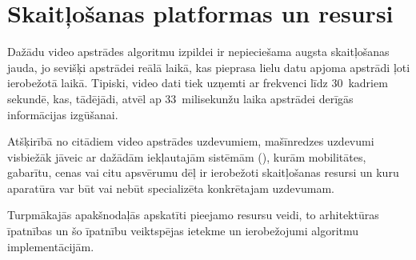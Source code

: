 \section{Skaitļošanas platformas un resursi} \label{sec:proc}
Dažādu video apstrādes algoritmu izpildei ir nepieciešama
augsta skaitļošanas jauda, jo sevišķi apstrādei reālā laikā, kas pieprasa
lielu datu apjoma apstrādi ļoti ierobežotā laikā. Tipiski, video dati
tiek uzņemti ar frekvenci līdz 30~kadriem sekundē, kas, tādējādi, atvēl ap
33~milisekunžu laika apstrādei derīgās informācijas izgūšanai.

Atšķirībā no citādiem video apstrādes uzdevumiem, mašīnredzes uzdevumi 
visbiežāk jāveic ar dažādām iekļautajām sistēmām (),
kurām mobilitātes, gabarītu, cenas vai citu apsvērumu dēļ ir ierobežoti
skaitļošanas resursi un kuru aparatūra var būt vai nebūt specializēta
konkrētajam uzdevumam.

Turpmākajās apakšnodaļās apskatīti pieejamo resursu veidi, to arhitektūras
īpatnības un šo īpatnību veiktspējas ietekme un ierobežojumi
algoritmu implementācijām.




